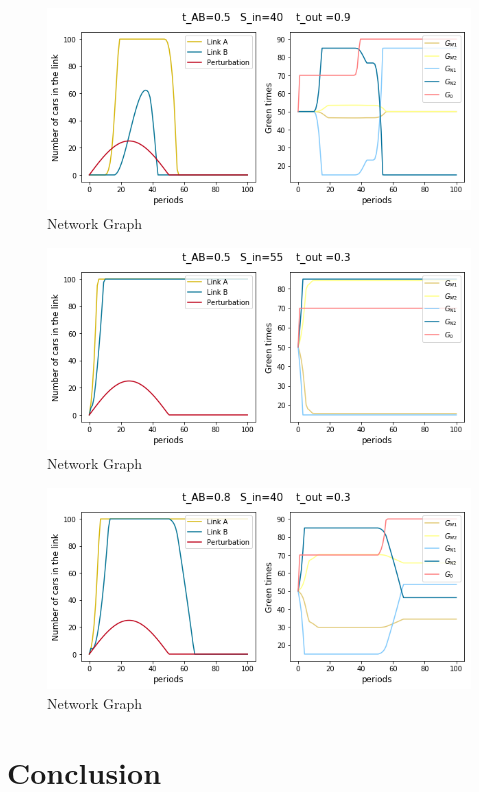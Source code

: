 \documentclass[11pt]{article}
\begin{document}
\begin{figure}
    \caption{Network Graph}
      \centering
	\includegraphics[width=15cm]{sim6}
\end{figure}

\begin{figure}
    \caption{Network Graph}
      \centering
	\includegraphics[width=15cm]{sim7}
\end{figure}

\begin{figure}
    \caption{Network Graph}
      \centering
	\includegraphics[width=15cm]{sim8}
\end{figure}

\section{Conclusion}
\end{document}
